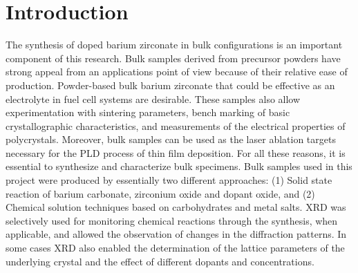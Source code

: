 \section{Introduction}
The synthesis of doped barium zirconate in bulk configurations is an important component of this research. Bulk samples derived from precursor powders have strong appeal from an applications point of view because of their relative ease of production. Powder-based bulk barium zirconate that could be effective as an electrolyte in fuel cell systems are desirable. These samples also allow experimentation with sintering parameters, bench marking of basic crystallographic characteristics, and measurements of the electrical properties of polycrystals. Moreover, bulk samples can be used as the laser ablation targets necessary for the PLD process of thin film deposition. For all these reasons, it is essential to synthesize and characterize bulk specimens. Bulk samples used in this project were produced by essentially two different approaches:  (1) Solid state reaction of barium carbonate, zirconium oxide and dopant oxide, and (2) Chemical solution techniques based on carbohydrates and metal salts. XRD was selectively used for monitoring chemical reactions through the synthesis, when applicable, and allowed the observation of changes in the diffraction patterns. In some cases XRD also enabled the determination of the lattice parameters of the underlying crystal and the effect of different dopants and concentrations. 




